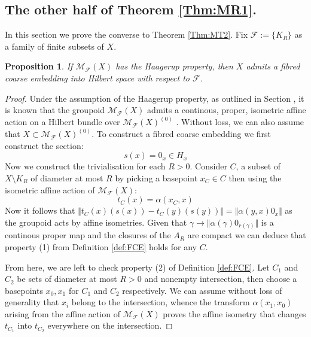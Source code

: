 \documentclass[11pt]{amsart}
\theoremstyle{plain}
\newtheorem{proposition}[theorem]{Proposition}%
\theoremstyle{definition}%
\theoremstyle{remark}%
\begin{document}
{\subsection{The other half of Theorem \ref{Thm:MR1}.}

In this section we prove the converse to Theorem \ref{Thm:MT2}. Fix $\mathcal{F}:=\lbrace K_{R} \rbrace$ as a family of finite subsets of $X$.

\begin{proposition}
If $\mathcal{M}_{\mathcal{F}}(X)$ has the Haagerup property, then $X$ admits a fibred coarse embedding into Hilbert space with respect to $\mathcal{F}$.
\end{proposition} 
\begin{proof}
Under the assumption of the Haagerup property, as outlined in Section , it is known that the groupoid $\mathcal{M}_{\mathcal{F}}(X)$ admits a continous, proper, isometric affine action on a Hilbert bundle over $\mathcal{M}_{\mathcal{F}}(X)^{(0)}$ \cite{MR1703305}. Without loss, we can also assume that $X \subset \mathcal{M}_{\mathcal{F}}(X)^{(0)}$. To construct a fibred coarse embedding we first construct the section:
\begin{equation*}
s(x) = 0_{x} \in H_{x}
\end{equation*}
Now we construct the trivialisation for each $R>0$. Consider $C$, a subset of $X\setminus K_{R}$ of diameter at most $R$ by picking a basepoint $x_{C} \in C$ then using the isometric affine action of $\mathcal{M}_{\mathcal{F}}(X)$:
\begin{equation*}
t_{C}(x)=\alpha(x_{C},x)
\end{equation*}
Now it follows that $\Vert t_{C}(x)(s(x)) - t_{C}(y)(s(y)) \Vert = \Vert \alpha(y,x)0_{x} \Vert$ as the groupoid acts by affine isometries. Given that $\gamma \rightarrow \Vert \alpha(\gamma)0_{r(\gamma)} \Vert$ is a continous proper map and the closures of the $A_{R}$ are compact we can deduce that property (1) from Definition \ref{def:FCE} holds for any $C$. 

From here, we are left to check property (2) of Definition \ref{def:FCE}. Let $C_{1}$ and $C_{2}$ be sets of diameter at most $R>0$ and nonempty intersection, then choose a basepoints $x_{0}, x_{1}$ for $C_{1}$ and $C_{2}$ respectively. We can assume without loss of generality that $x_{i}$ belong to the intersection, whence the transform $\alpha(x_{1},x_{0})$ arising from the affine action of $\mathcal{M}_{\mathcal{F}}(X)$ proves the affine isometry that changes $t_{C_{1}}$ into $t_{C_{2}}$ everywhere on the intersection. 
\end{proof}

}
\end{document}
